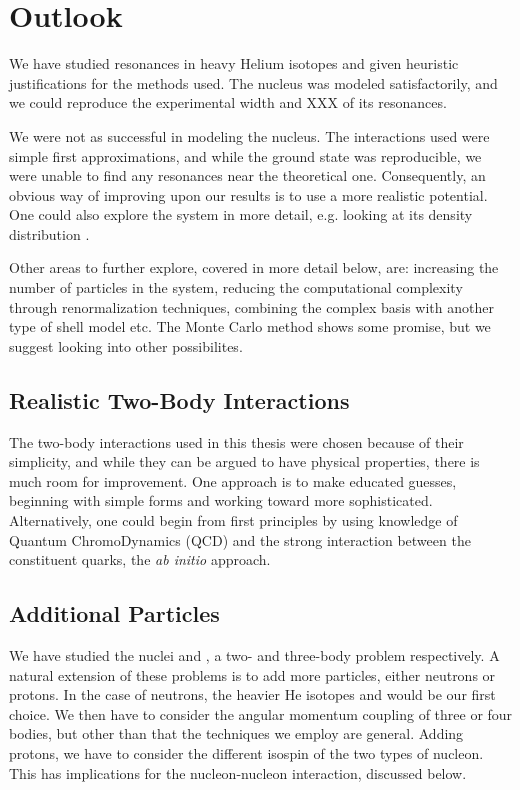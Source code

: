 \documentclass[../main/report.tex]{subfiles}
\begin{document}
\chapter{Outlook}
\label{cha:outlook}


We have studied resonances in heavy Helium isotopes and given heuristic justifications for the methods used. The  nucleus was modeled satisfactorily, and we could reproduce the experimental width and XXX of its resonances. 

We were not as successful in modeling the  nucleus. The interactions used were simple first approximations, and while the ground state was reproducible, we were unable to find any resonances near the theoretical one. Consequently, an obvious way of improving upon our results is to use a more realistic potential. One could also explore the  system in more detail, e.g. looking at its density distribution \cite{radii}.

Other areas to further explore, covered in more detail below, are: increasing the number of particles in the system, reducing the computational complexity through renormalization techniques, combining the complex basis with another type of shell model etc.
The Monte Carlo method shows some promise, but we suggest looking into other possibilites.

\section{Realistic Two-Body Interactions}

The two-body interactions used in this thesis were chosen because of their simplicity, and while they can be argued to have physical properties, there is much room for improvement. 
One approach is to make educated guesses, beginning with simple forms and working toward more sophisticated. 
Alternatively, one could begin from first principles by using knowledge of Quantum ChromoDynamics (QCD) and the strong interaction between the constituent quarks, the \emph{ab initio} approach.

\section{Additional Particles}

We have studied the nuclei  and , a two- and three-body problem respectively. 
A natural extension of these problems is to add more particles, either neutrons or protons.
In the case of neutrons, the heavier He isotopes  and  would be our first choice.
We then have to consider the angular momentum coupling of three or four bodies, but other than that the techniques we employ are general.
Adding protons, we have to consider the different isospin of the two types of nucleon.
This has implications for the nucleon-nucleon interaction, discussed below.
\end{document}

